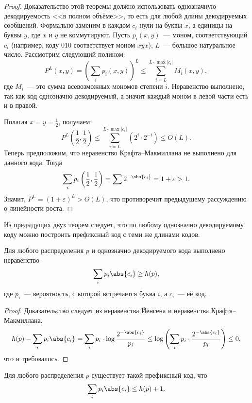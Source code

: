 \begin{proof}
    Доказательство этой теоремы должно использовать однозначную декодируемость <<в полном объёме>>, то
    есть для любой длины декодируемых сообщений. Формально заменим в каждом $c_i$ нули на буквы $x$, а
    единицы на буквы $y$, где $x$ и $y$ не коммутируют. Пусть $p_i(x, y)$~--- моном, соответствующий
    $c_i$ (например, коду $010$ соответствует моном $xyx$); $L$~--- большое натуральное число. Рассмотрим
    следующий полином:
    $$
        P^L(x, y) = \left(\sum_{i} p_i(x, y) \right)^L \le \sum_{i = L}^{L \cdot \max |c_i|} M_{i}(x, y),
    $$
    где $M_i$~--- это сумма всевозможных мономов степени $i$. Неравенство выполнено, так как код
    однозначно декодируемый, а значит каждый моном в левой части есть и в правой.

    Полагая $x = y = \frac{1}{2}$, получаем:
    $$
        P^L\left(\frac{1}{2},\frac{1}{2}\right) \le \sum_{i = L}^{L \cdot \max |c_i|}(2^i \cdot 2^{-i})
        \le O(L).
    $$
    Теперь предположим, что неравенство Крафта--Макмиллана не выполнено для данного кода. Тогда 
    $$
        \sum_i p_i\left(\frac{1}{2},\frac{1}{2}\right) = \sum 2^{-\abs{c_i}} = 1 + \varepsilon > 1.
    $$
    Значит, $P^L = (1 + \varepsilon)^{L} > O(L)$, что противоречит предыдущему рассуждению о линейности
    роста.
\end{proof}

Из предыдущих двух теорем следует, что по любому однозначно декодируемому коду можно построить префиксный
код с теми же длинами кодов.

\begin{theorem}[Шеннон]
    Для любого распределения $p$ и однозначно декодируемого кода выполнено неравенство
    $$
        \sum_i p_i\abs{c_i} \ge h(p),
    $$
    где $p_i$~--- вероятность, с которой встречается буква $i$, а $c_i$~--- её код. 
\end{theorem}

\begin{proof}
    Доказательство следует из неравенства Йенсена и неравенства Крафта--Макмиллана, 
    $$
        h(p) - \sum_i p_i\abs{c_i} = \sum_i p_i \cdot \log\frac{2^{-\abs{c_i}}}{p_i}
            \le \log\left(\sum_i p_i \cdot \frac{2^{-\abs{c_i}}}{p_i} \right) \le 0,
    $$
    что и требовалось.
\end{proof}

\begin{theorem}
    \label{th:prefix-code}
    Для любого распределения $p$ существует такой префиксный код, что
    $$
        \sum_i p_i\abs{c_i} \le h(p) + 1.
    $$
\end{theorem}

